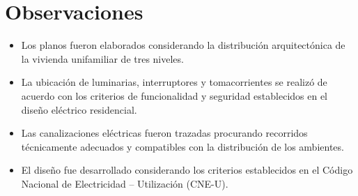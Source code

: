 \section{Observaciones}

\begin{itemize}
	\item Los planos fueron elaborados considerando la distribución arquitectónica de la vivienda unifamiliar de tres niveles.
	
	\item La ubicación de luminarias, interruptores y tomacorrientes se realizó de acuerdo con los criterios de funcionalidad y seguridad establecidos en el diseño eléctrico residencial.
	
	\item Las canalizaciones eléctricas fueron trazadas procurando recorridos técnicamente adecuados y compatibles con la distribución de los ambientes.
	
	\item El diseño fue desarrollado considerando los criterios establecidos en el Código Nacional de Electricidad -- Utilización (CNE-U).
\end{itemize}
